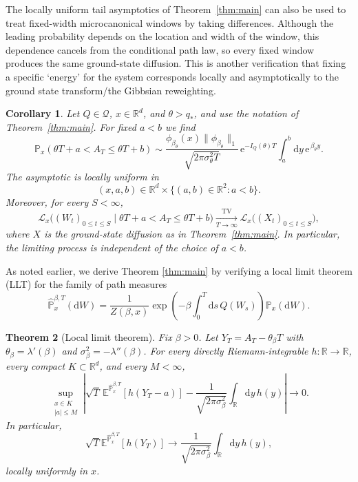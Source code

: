 \documentclass[11pt,reqno]{amsart}
\newtheorem{theorem}{Theorem}[section]
\newtheorem{corollary}[theorem]{Corollary}
\theoremstyle{definition}
\numberwithin{equation}{section}
\newcommand{\<}{\langle}
\renewcommand{\>}{\rangle}
\def\R{{\mathbb R}}
\def\de{{\rm d}}
\def\de{{\mathrm {d}}}
\def\lt{\left}
\def\rt{\right}
\def\bbE{{\mathbb{E}}}
\def\bbP{{\mathbb{P}}}
\def\bbPh{{\hat{\mathbb{P}}}}
\def\bbR{{\mathbb{R}}}
\begin{document}
 The locally uniform tail asymptotics of Theorem~\ref{thm:main} can also be used to treat fixed-width microcanonical windows by
taking differences.  Although the leading probability depends on the location and width of the window, this dependence cancels from the conditional path law, so every fixed window produces the same ground-state diffusion. This is another verification that fixing a specific `energy' for the system corresponds locally and asymptotically to the ground state transform/the Gibbsian reweighting.
\begin{corollary}
\label{cor:fixed-width-window}
Let $Q\in\mathcal Q$, $x\in\mathbb R^d$, and $\theta>q_*$, and use the
notation of Theorem~\ref{thm:main}.  For fixed $a<b$ we find
\[
\mathbb P_x(\theta T+a<A_T\leq \theta T+b)
\sim
\frac{\phi_{\beta_\theta}(x)\|\phi_{\beta_\theta}\|_1}
     {\sqrt{2\pi\sigma_\theta^2T}}\,
\mathrm e^{-I_Q(\theta)T}
\int_a^b \de y \, \mathrm e^{\,\beta_\theta y} .
\]
The asymptotic is locally uniform in
\[
(x,a,b)\in
\bbR^d \times\bigl\{(a,b)\in\mathbb R^2:a<b\bigr\}.
\]
Moreover, for every $S<\infty$,
\[
\mathcal L_x\bigl((W_t)_{0\leq t\leq S}\mid \theta T+a<A_T\leq \theta T+b\bigr)
\xrightarrow[T\to\infty]{\mathrm{TV}}
\mathcal L_x\bigl((X_t)_{0\leq t\leq S}\bigr),
\]
where $X$ is the ground-state diffusion as in Theorem~\ref{thm:main}.  In particular,
the limiting process is independent of the choice of $a<b$.
\end{corollary}

As noted earlier, we derive Theorem \ref{thm:main} by verifying a local limit theorem (LLT) for the family of path measures
\begin{equation}
    \label{equ:FK_path_measures}
    \widehat\bbP_x ^{\beta,T} (\de W)= \frac{1}{Z(\beta,x)} \exp \lt( -\beta \int_0 ^T \de s \,Q(W_s)\rt)\bbP_x (\de W).
\end{equation}

\begin{theorem}[Local limit theorem]
\label{thm:llt}
Fix $\beta >0$.
Let $Y_T=A_T-\theta_\beta T$ with $\theta_\beta = \lambda'(\beta)$ and $\sigma^2_\beta = - \lambda''(\beta)$.  For every directly Riemann-integrable
$h:\mathbb R\to\mathbb R$, every compact $K\subset\mathbb R^d$, and every $M<\infty$,
\begin{equation}
    \nonumber
 \sup_{\substack{x\in K\\|a|\leq M}}
 \left|
  \sqrt T\,\bbE^{\bbPh^{\beta,T}_x}[h(Y_T-a)]
  -\frac1{\sqrt{2\pi\sigma_\beta^2}}
   \int_\R \de y \, h(y)
 \right|
 \longrightarrow0.
\end{equation}
In particular,
\begin{equation}
\nonumber
 \sqrt T\bbE^{\bbPh^{\beta,T}_x}[h(Y_T)]
 \longrightarrow
 \frac1{\sqrt{2\pi\sigma_\beta^2}}
 \int_\bbR \de y \, h(y),
\end{equation}
locally uniformly in $x$.
\end{theorem}
\end{document}
